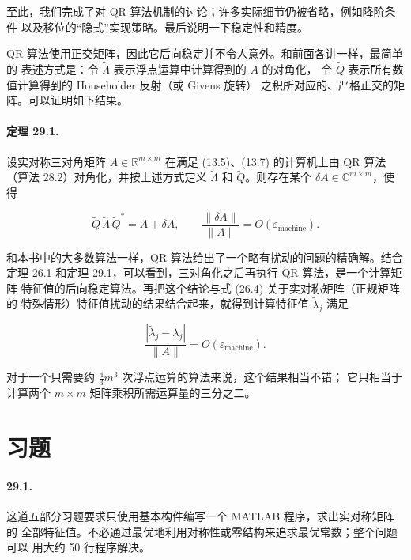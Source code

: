\documentclass[UTF8,fontset=none,12pt]{ctexart}
\begin{document}
至此，我们完成了对 QR 算法机制的讨论；许多实际细节仍被省略，例如降阶条件
以及移位的“隐式”实现策略。最后说明一下稳定性和精度。

QR 算法使用正交矩阵，因此它后向稳定并不令人意外。和前面各讲一样，最简单的
表述方式是：令 $\widetilde\Lambda$ 表示浮点运算中计算得到的 $A$ 的对角化，
令 $\widetilde Q$ 表示所有数值计算得到的 Householder 反射（或 Givens 旋转）
之积所对应的、严格正交的矩阵。可以证明如下结果。

\paragraph{定理 29.1.}
设实对称三对角矩阵 $A\in\mathbb{R}^{m\times m}$ 在满足 (13.5)、(13.7)
的计算机上由 QR 算法（算法 28.2）对角化，并按上述方式定义
$\widetilde\Lambda$ 和 $\widetilde Q$。则存在某个
$\delta A\in\mathbb{C}^{m\times m}$，使得

\begin{equation}
\widetilde Q\,\widetilde\Lambda\,\widetilde Q^*
 =A+\delta A,
\qquad
\frac{\|\delta A\|}{\|A\|}=O(\varepsilon_{\mathrm{machine}}).
\tag{29.9}
\end{equation}

和本书中的大多数算法一样，QR 算法给出了一个略有扰动的问题的精确解。结合
定理 26.1 和定理 29.1，可以看到，三对角化之后再执行 QR 算法，是一个计算矩阵
特征值的后向稳定算法。再把这个结论与式 (26.4) 关于实对称矩阵（正规矩阵的
特殊情形）特征值扰动的结果结合起来，就得到计算特征值 $\widetilde\lambda_j$
满足

\begin{equation}
\frac{|\widetilde\lambda_j-\lambda_j|}{\|A\|}
 =O(\varepsilon_{\mathrm{machine}}).
\tag{29.10}
\end{equation}

对于一个只需要约 $\frac{4}{3}m^3$ 次浮点运算的算法来说，这个结果相当不错；
它只相当于计算两个 $m\times m$ 矩阵乘积所需运算量的三分之二。

\section*{习题}

\paragraph{29.1.}
这道五部分习题要求只使用基本构件编写一个 MATLAB 程序，求出实对称矩阵的
全部特征值。不必通过最优地利用对称性或零结构来追求最优常数；整个问题可以
用大约 50 行程序解决。
\end{document}
